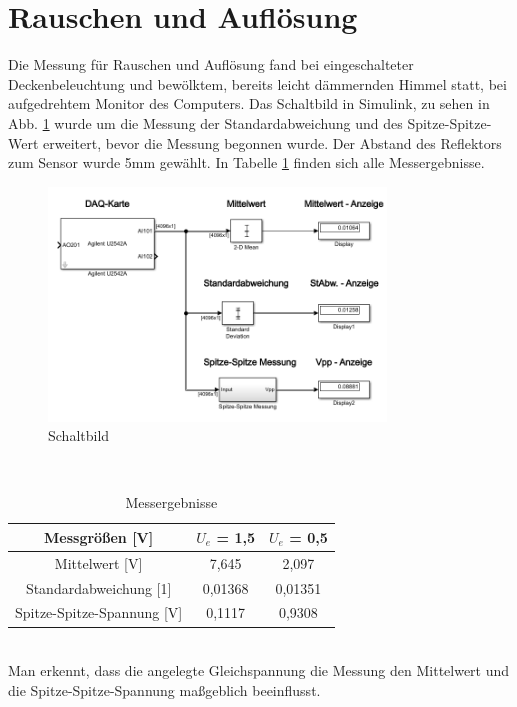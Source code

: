 \section{Rauschen und Auflösung}

Die Messung für Rauschen und Auflösung fand bei eingeschalteter Deckenbeleuchtung und bewölktem, bereits leicht dämmernden Himmel statt, bei aufgedrehtem Monitor des Computers. Das Schaltbild in Simulink, zu sehen in Abb. \ref{fg:schalt_rauschen} wurde um die Messung der Standardabweichung und des Spitze-Spitze-Wert erweitert, bevor die Messung begonnen wurde. Der Abstand des Reflektors zum Sensor wurde  5mm gewählt. In Tabelle \ref{tb:messerg} finden sich alle Messergebnisse.
\begin{figure}[!h]
	\centering
	\includegraphics[width=0.8\textwidth]{./img/ch6/6_3_3}
	\caption{Schaltbild}
	\label{fg:schalt_rauschen}
\end{figure}
~\\
\begin{table}[!h]
	\centering
	\begin{tabular}{|c|c|c|}
	\hline 
	Messgrößen [V]			& $U_e$ = 1,5		& $U_e$ = 0,5 	\\ 
	\hline 
	Mittelwert [V]			& 7,645			& 2,097	\\ 
	\hline 
	Standardabweichung [1]		& 0,01368			& 0,01351	\\ 
	\hline 
	Spitze-Spitze-Spannung [V]	& 0,1117			& 0,9308	\\ 
	\hline 
	\end{tabular}
	\caption{Messergebnisse}
	\label{tb:messerg}
\end{table}
~\\
Man erkennt, dass die angelegte Gleichspannung die Messung den Mittelwert und die Spitze-Spitze-Spannung maßgeblich beeinflusst.
~\\

